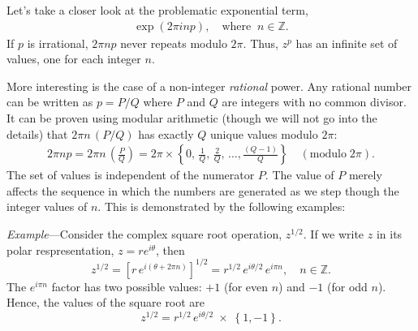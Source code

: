 \documentclass[10pt,a4paper]{article}
\begin{document}
Let's take a closer look at the problematic exponential term,
\begin{align}
  \exp\left(2\pi i np\right), \quad\mathrm{where}\;\; n \in \mathbb{Z}.
\end{align}
If $p$ is irrational, $2\pi np$ never repeats modulo $2\pi$. Thus,
$z^p$ has an infinite set of values, one for each integer $n$.

More interesting is the case of a non-integer \textit{rational}
power. Any rational number can be written as $p = P/Q$ where $P$ and
$Q$ are integers with no common divisor.  It can be proven using
modular arithmetic (though we will not go into the details) that $2\pi
n\, (P/Q)$ has exactly $Q$ unique values modulo $2\pi$:
\begin{align}
  2 \pi n p = 2\pi n\, \left(\frac{P}{Q}\right) = 2\pi \times \left\{0,\, \frac{1}{Q},\, \frac{2}{Q},\, \dots, \frac{(Q-1)}{Q} \right\} \quad(\mathrm{modulo} \; 2\pi).
\end{align}
The set of values is independent of the numerator $P$.  The value of
$P$ merely affects the sequence in which the numbers are generated as
we step though the integer values of $n$. This is demonstrated by the
following examples:

\begin{framed} \noindent
\textit{Example}---Consider the complex square root operation,
$z^{1/2}$. If we write $z$ in its polar respresentation, $z = r
e^{i\theta}$, then
\begin{equation}
  z^{1/2} = \left[r \, e^{i(\theta + 2 \pi n)} \right]^{1/2} = r^{1/2} \, e^{i\theta/2} \, e^{i \pi n}, \quad n \in \mathbb{Z}.
\end{equation}
The $e^{i\pi n}$ factor has two possible values: $+1$ (for even $n$) and $-1$ (for odd $n$). Hence, the values of the square root are
\begin{equation}
  z^{1/2} = r^{1/2} \, e^{i\theta/2} \;\times\; \left\{1, -1\right\}.
\end{equation}
\end{framed}
\end{document}
